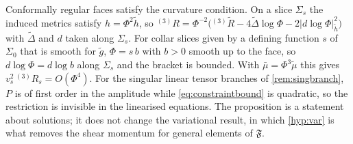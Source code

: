 \documentclass[11pt]{article}
\theoremstyle{canonmath}
\theoremstyle{canonpostulate}
\theoremstyle{canonproposition}
\theoremstyle{canonmath}
\theoremstyle{canonproposition}
\providecommand{\Fcl}{\mathfrak{F}}
\begin{document}
Conformally regular faces satisfy the curvature condition. On a slice $\Sigma_s$ the induced metrics satisfy $h = \Phi^2\tilde h$, so ${}^{(3)}\!R = \Phi^{-2}\bigl({}^{(3)}\!\tilde R - 4\tilde\Delta\log\Phi - 2|d\log\Phi|^2_{\tilde h}\bigr)$ with $\tilde\Delta$ and $d$ taken along $\Sigma_s$. For collar slices given by a defining function $s$ of $\Sigma_0$ that is smooth for $\tilde g$, $\Phi = s\,b$ with $b>0$ smooth up to the face, so $d\log\Phi = d\log b$ along $\Sigma_s$ and the bracket is bounded. With $\bar\mu = \Phi^3\tilde\mu$ this gives $v_s^2\,{}^{(3)}\!R_s = O(\Phi^4)$. For the singular linear tensor branches of \cref{rem:singbranch}, $P$ is of first order in the amplitude while \eqref{eq:constraintbound} is quadratic, so the restriction is invisible in the linearised equations. The proposition is a statement about solutions; it does not change the variational result, in which \ref{hyp:var} is what removes the shear momentum for general elements of $\Fcl$.
\end{document}
